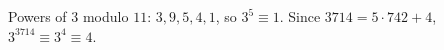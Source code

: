 Powers of $3$ modulo $11$: $3,9,5,4,1$, so $3^5\equiv1$. Since $3714=5\cdot742+4$, $3^{3714}\equiv3^4\equiv\boxed{4}$.
